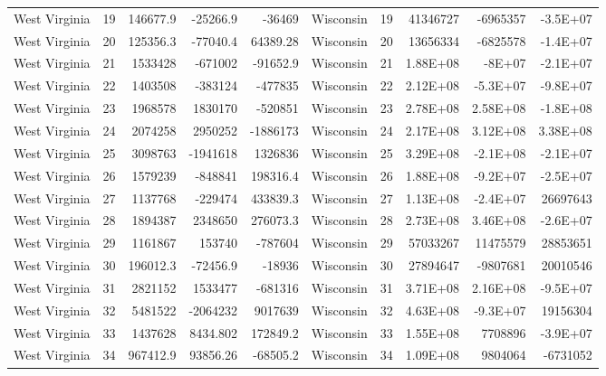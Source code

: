 \begin{landscape}
\begin{singlespace}
\begin{longtable}{lrrrr|lrrrr}
		West Virginia &  19 & 146677.9 & -25266.9 & -36469 & Wisconsin &  19 & 41346727 & -6965357 & -3.5E+07 \\
		West Virginia &  20 & 125356.3 & -77040.4 & 64389.28 & Wisconsin &  20 & 13656334 & -6825578 & -1.4E+07 \\
		West Virginia &  21 & 1533428 & -671002 & -91652.9 & Wisconsin &  21 & 1.88E+08 & -8E+07 & -2.1E+07 \\
		West Virginia &  22 & 1403508 & -383124 & -477835 & Wisconsin &  22 & 2.12E+08 & -5.3E+07 & -9.8E+07 \\
		West Virginia &  23 & 1968578 & 1830170 & -520851 & Wisconsin &  23 & 2.78E+08 & 2.58E+08 & -1.8E+08 \\
		West Virginia &  24 & 2074258 & 2950252 & -1886173 & Wisconsin &  24 & 2.17E+08 & 3.12E+08 & 3.38E+08 \\
		West Virginia &  25 & 3098763 & -1941618 & 1326836 & Wisconsin &  25 & 3.29E+08 & -2.1E+08 & -2.1E+07 \\
		West Virginia &  26 & 1579239 & -848841 & 198316.4 & Wisconsin &  26 & 1.88E+08 & -9.2E+07 & -2.5E+07 \\
		West Virginia &  27 & 1137768 & -229474 & 433839.3 & Wisconsin &  27 & 1.13E+08 & -2.4E+07 & 26697643 \\
		West Virginia &  28 & 1894387 & 2348650 & 276073.3 & Wisconsin &  28 & 2.73E+08 & 3.46E+08 & -2.6E+07 \\
		West Virginia &  29 & 1161867 & 153740 & -787604 & Wisconsin &  29 & 57033267 & 11475579 & 28853651 \\
		West Virginia &  30 & 196012.3 & -72456.9 & -18936 & Wisconsin &  30 & 27894647 & -9807681 & 20010546 \\
		West Virginia &  31 & 2821152 & 1533477 & -681316 & Wisconsin &  31 & 3.71E+08 & 2.16E+08 & -9.5E+07 \\
		West Virginia &  32 & 5481522 & -2064232 & 9017639 & Wisconsin &  32 & 4.63E+08 & -9.3E+07 & 19156304 \\
		West Virginia &  33 & 1437628 & 8434.802 & 172849.2 & Wisconsin &  33 & 1.55E+08 & 7708896 & -3.9E+07 \\
		West Virginia &  34 & 967412.9 & 93856.26 & -68505.2 & Wisconsin &  34 & 1.09E+08 & 9804064 & -6731052\\


\end{longtable}
\end{singlespace}
\end{landscape}
